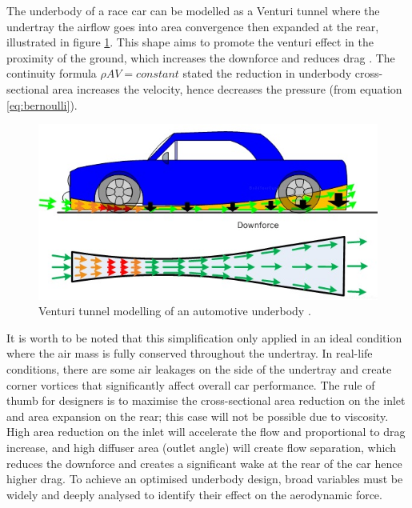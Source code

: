 \noindent The underbody of a race car can be modelled as a Venturi tunnel where the undertray the airflow goes into area convergence then expanded at the rear, illustrated in figure \ref{fig:venturi_tunnel_car}. This shape aims to promote the venturi effect in the proximity of the ground, which increases the downforce and reduces drag \cite{Katz2005AerodynamicsCars}. The continuity formula $\rho AV = constant$ stated the reduction in underbody cross-sectional area increases the velocity, hence decreases the pressure (from equation \ref{eq:bernoulli}).

\begin{figure}[!ht]
    \centering
    \includegraphics[scale=0.8]{Figures/venturi_tunnel.jpg}
    \caption{Venturi tunnel modelling of an automotive underbody \cite{Anonymous2020RaceDesign}.}
    \label{fig:venturi_tunnel_car}
\end{figure}

\noindent It is worth to be noted that this simplification only applied in an ideal condition where the air mass is fully conserved throughout the undertray. In real-life conditions, there are some air leakages on the side of the undertray and create corner vortices that significantly affect overall car performance. The rule of thumb for designers is to maximise the cross-sectional area reduction on the inlet and area expansion on the rear; this case will not be possible due to viscosity. High area reduction on the inlet will accelerate the flow and proportional to drag increase, and high diffuser area (outlet angle) will create flow separation, which reduces the downforce and creates a significant wake at the rear of the car hence higher drag. To achieve an optimised underbody design, broad variables must be widely and deeply analysed to identify their effect on the aerodynamic force.


